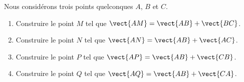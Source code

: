 
\begin{exercice}\label{exosmath-0075}

    Nous considérons trois points quelconques \( A\), \( B\) et \( C\).
    \begin{enumerate}
        \item
            Construire le point \( M\) tel que \( \vect{ AM }=\vect{ AB }+\vect{ BC }\).
        \item
            Construire le point \( N\) tel que \( \vect{ AN }=\vect{ AB }+\vect{ AC }\).
        \item
            Construire le point \( P\) tel que \( \vect{ AP }=\vect{ AB }+\vect{ CB }\).
        \item
            Construire le point \( Q\) tel que \( \vect{ AQ }=\vect{ AB }+\vect{ CA }\).
    \end{enumerate}

\end{exercice}
